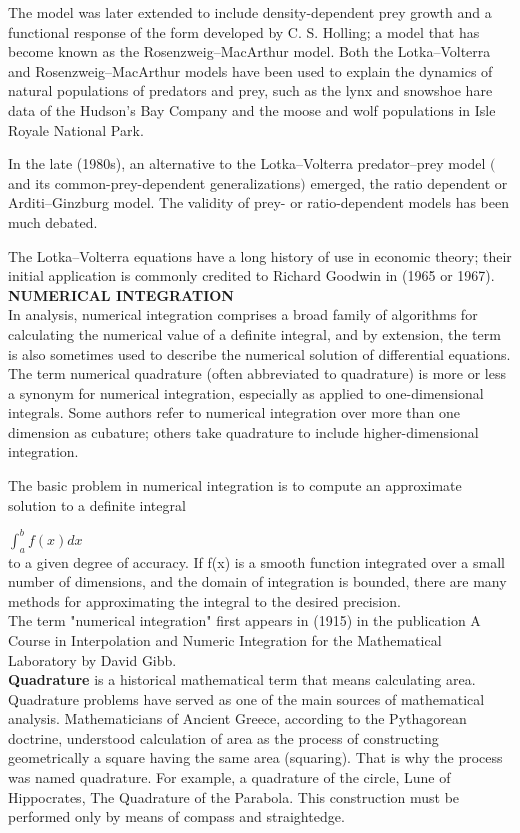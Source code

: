 \documentclass[a4paper,12pt]{report}
\numberwithin{equation}{section}
\begin{document}
The model was later extended to include density-dependent prey growth and a functional response of the form developed by C. S. Holling; a model that has become known as the Rosenzweig–MacArthur model. Both the Lotka–Volterra and Rosenzweig–MacArthur models have been used to explain the dynamics of natural populations of predators and prey, such as the lynx and snowshoe hare data of the Hudson's Bay Company and the moose and wolf populations in Isle Royale National Park.

In the late (1980s), an alternative to the Lotka–Volterra predator–prey model $($and its common-prey-dependent generalizations$)$ emerged, the ratio dependent or Arditi–Ginzburg model. The validity of prey- or ratio-dependent models has been much debated.

The Lotka–Volterra equations have a long history of use in economic theory; their initial application is commonly credited to Richard Goodwin in (1965 or 1967).\\


\textbf{NUMERICAL INTEGRATION}\\

In analysis, numerical integration comprises a broad family of algorithms for calculating the numerical value of a definite integral, and by extension, the term is also sometimes used to describe the numerical solution of differential equations. The term numerical quadrature (often abbreviated to quadrature) is more or less a synonym for numerical integration, especially as applied to one-dimensional integrals. Some authors refer to numerical integration over more than one dimension as cubature; others take quadrature to include higher-dimensional integration.

The basic problem in numerical integration is to compute an approximate solution to a definite integral

$\int _{a}^{b}f(x)dx$\\
to a given degree of accuracy. If f(x) is a smooth function integrated over a small number of dimensions, and the domain of integration is bounded, there are many methods for approximating the integral to the desired precision.\\

The term "numerical integration" first appears in (1915) in the publication A Course in Interpolation and Numeric Integration for the Mathematical Laboratory by David Gibb.\\

\textbf{Quadrature} is a historical mathematical term that means calculating area. Quadrature problems have served as one of the main sources of mathematical analysis. Mathematicians of Ancient Greece, according to the Pythagorean doctrine, understood calculation of area as the process of constructing geometrically a square having the same area (squaring). That is why the process was named quadrature. For example, a quadrature of the circle, Lune of Hippocrates, The Quadrature of the Parabola. This construction must be performed only by means of compass and straightedge.
\end{document}
